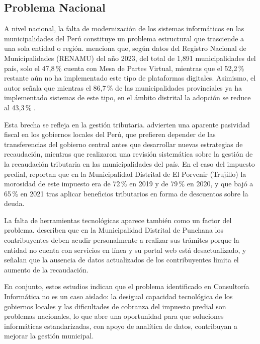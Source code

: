 \documentclass[12pt,a4paper]{report}
\begin{document}
\subsection{Problema Nacional}

A nivel nacional, la falta de modernización de los sistemas informáticos en las municipalidades del Perú constituye un problema estructural que trasciende a una sola entidad o región. \textcite{francoulco2026} menciona que, según datos del Registro Nacional de Municipalidades (RENAMU) del año 2023, del total de 1,891 municipalidades del país, solo el 47,8\,\% cuenta con Mesa de Partes Virtual, mientras que el 52,2\,\% restante aún no ha implementado este tipo de plataformas digitales. Asimismo, el autor señala que mientras el 86,7\,\% de las municipalidades provinciales ya ha implementado sistemas de este tipo, en el ámbito distrital la adopción se reduce al 43,3\,\% \parencite{francoulco2026}.

Esta brecha se refleja en la gestión tributaria. \textcite{romerocarazas2021} advierten una aparente pasividad fiscal en los gobiernos locales del Perú, que prefieren depender de las transferencias del gobierno central antes que desarrollar nuevas estrategias de recaudación, mientras que \textcite{rojasbarbaran2021} realizaron una revisión sistemática sobre la gestión de la recaudación tributaria en las municipalidades del país. En el caso del impuesto predial, \textcite{riosvelasquez2022} reportan que en la Municipalidad Distrital de El Porvenir (Trujillo) la morosidad de este impuesto era de 72\,\% en 2019 y de 79\,\% en 2020, y que bajó a 65\,\% en 2021 tras aplicar beneficios tributarios en forma de descuentos sobre la deuda.

La falta de herramientas tecnológicas aparece también como un factor del problema. \textcite{soriadiaz2022} describen que en la Municipalidad Distrital de Punchana los contribuyentes deben acudir personalmente a realizar sus trámites porque la entidad no cuenta con servicios en línea y su portal web está desactualizado, y señalan que la ausencia de datos actualizados de los contribuyentes limita el aumento de la recaudación.

En conjunto, estos estudios indican que el problema identificado en Consultoría Informática no es un caso aislado: la desigual capacidad tecnológica de los gobiernos locales y las dificultades de cobranza del impuesto predial son problemas nacionales, lo que abre una oportunidad para que soluciones informáticas estandarizadas, con apoyo de analítica de datos, contribuyan a mejorar la gestión municipal.
\end{document}
